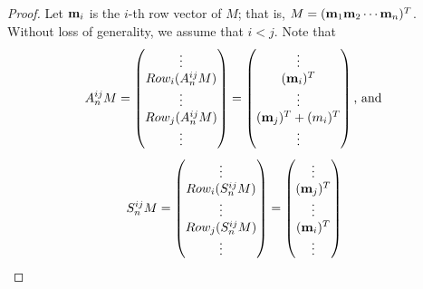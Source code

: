\begin{proof}
Let $ \mathbf{m}_i $ is the $ i $-th row vector of $ M $; that is, $ M = (\mathbf{m}_1 \mathbf{m}_2 \cdots \mathbf{m}_n)^T $.
    Without loss of generality, we assume that $ i < j $. 
    Note that 
    \begin{align*}
        A_n^{ij} M = \begin{pmatrix}
            \vdots                 \\
            Row_i(A_n^{ij} M)     \\
            \vdots                 \\
            Row_j(A_n^{ij} M)     \\
            \vdots                 \\
        \end{pmatrix}
        = \begin{pmatrix}
            \vdots                \\
            (\mathbf{m}_{i})^T             \\
            \vdots                \\
            (\mathbf{m}_{j})^T + (m_{i})^T \\
            \vdots                
        \end{pmatrix}
        \text{, and }
    \end{align*}
    \begin{align*}
        S_n^{ij} M = \begin{pmatrix}
            \vdots                 \\
            Row_i(S_n^{ij} M)     \\
            \vdots                 \\
            Row_j(S_n^{ij} M)     \\
            \vdots                 \\
        \end{pmatrix}
        = \begin{pmatrix}
            \vdots      \\
            (\m_{j})^T   \\
            \vdots      \\
            (\m_{i})^T   \\
            \vdots
        \end{pmatrix}
        \begin{matrix}
            \vphantom{\vdots}       \\
            \vphantom{(\m_{j})^T}   \\
            \vphantom{\vdots}       \\

\end{matrix}
\end{align*}
\end{proof}
